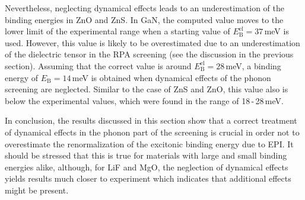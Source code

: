 Nevertheless, neglecting dynamical effects leads to an underestimation of the binding energies in ZnO and ZnS. In GaN, the computed value moves to the lower limit of the experimental range when a starting value of  $E_\text{B}^\text{el}=37$\,meV is used. However, this value is likely to be overestimated due to an underestimation of the dielectric tensor in the RPA screening (see the discussion in the previous section). Assuming that the correct value is around $E_\text{B}^\text{el}=28$\,meV, a binding energy of $E_\text{B}^{\phantom{l}}=14$\,meV is obtained when dynamical effects of the phonon screening are neglected. Similar to the case of ZnS and ZnO, this value also is below the experimental values, which were found in the range of 18\,-\,28\,meV.\par
In conclusion, the results discussed in this section show that a correct treatment of dynamical effects in the phonon part of the screening is crucial in order not to overestimate the renormalization of the excitonic binding energy due to EPI. It should be stressed  that this is true for materials with large and small binding energies alike, although, for LiF and MgO, the neglection of dynamical effects yields results much closer to experiment which indicates that additional effects might be present. 

